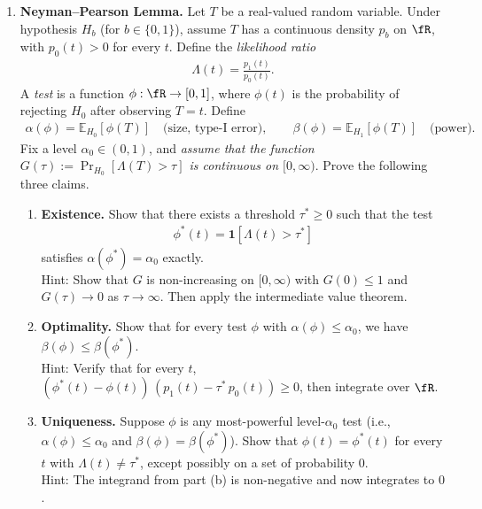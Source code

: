 \documentclass[12pt]{article}
\renewcommand{\fE}{\mathbb{E}}
\begin{document}
\begin{enumerate}

\item \textbf{Neyman--Pearson Lemma.}
Let $T$ be a real-valued random variable. Under hypothesis $H_b$ (for $b \in \{0, 1\}$), assume $T$ has a continuous density $p_b$ on $\fR$, with $p_0(t) > 0$ for every $t$. Define the \emph{likelihood ratio}
\begin{align*}
    \Lambda(t) = \frac{p_1(t)}{p_0(t)}.
\end{align*}
A \emph{test} is a function $\phi : \fR \to [0, 1]$, where $\phi(t)$ is the probability of rejecting $H_0$ after observing $T = t$. Define
\begin{align*}
    \alpha(\phi) = \fE_{H_0}[\phi(T)] \quad \text{(size, type-I error)}, \qquad \beta(\phi) = \fE_{H_1}[\phi(T)] \quad \text{(power)}.
\end{align*}
Fix a level $\alpha_0 \in (0, 1)$, and \emph{assume that the function $G(\tau) := \Pr_{H_0}[\Lambda(T) > \tau]$ is continuous on $[0, \infty)$}. Prove the following three claims.
\begin{enumerate}
    \item \textbf{Existence.} Show that there exists a threshold $\tau^* \ge 0$ such that the test
    \begin{align*}
        \phi^*(t) = \mathbf{1}[\Lambda(t) > \tau^*]
    \end{align*}
    satisfies $\alpha(\phi^*) = \alpha_0$ exactly.\\
    Hint: Show that $G$ is non-increasing on $[0, \infty)$ with $G(0) \le 1$ and $G(\tau) \to 0$ as $\tau \to \infty$. Then apply the intermediate value theorem.

    \item \textbf{Optimality.} Show that for every test $\phi$ with $\alpha(\phi) \le \alpha_0$, we have $\beta(\phi) \le \beta(\phi^*)$.\\
    Hint: Verify that for every $t$, $(\phi^*(t) - \phi(t))\,(p_1(t) - \tau^*\, p_0(t)) \ge 0$, then integrate over $\fR$.

    \item \textbf{Uniqueness.} Suppose $\phi$ is any most-powerful level-$\alpha_0$ test (i.e., $\alpha(\phi) \le \alpha_0$ and $\beta(\phi) = \beta(\phi^*)$). Show that $\phi(t) = \phi^*(t)$ for every $t$ with $\Lambda(t) \ne \tau^*$, except possibly on a set of probability $0$.\\
    Hint: The integrand from part (b) is non-negative and now integrates to $0$.
\end{enumerate}


\end{enumerate}
\end{document}
